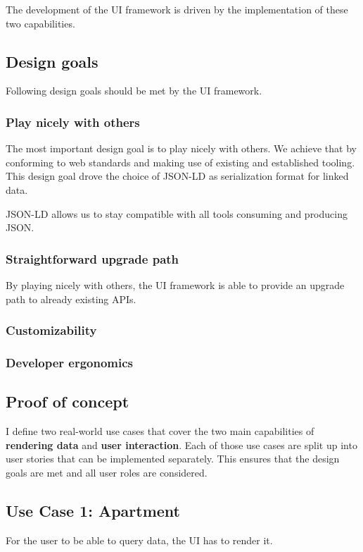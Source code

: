 The development of the UI framework is driven by the implementation of these two capabilities.

\subsection{Design goals}
Following design goals should be met by the UI framework.

\subsubsection{Play nicely with others}\label{usecases}
The most important design goal is to play nicely with others. We achieve that by conforming to web standards and making use of existing and established tooling. This design goal drove the choice of JSON-LD as serialization format for linked data.

JSON-LD allows us to stay compatible with all tools consuming and producing JSON.

\subsubsection{Straightforward upgrade path}\label{usecases}
By playing nicely with others, the UI framework is able to provide an upgrade path to already existing APIs.

\subsubsection{Customizability}\label{usecases}

\subsubsection{Developer ergonomics}\label{usecases}

\subsection{Proof of concept}
I define two real-world use cases that cover the two main capabilities of \textbf{rendering data} and \textbf{user interaction}. Each of those use cases are split up into user stories that can be implemented separately. This ensures that the design goals are met and all user roles are considered.

\subsection{Use Case 1: Apartment}\label{usecases}
For the user to be able to query data, the UI has to render it.

